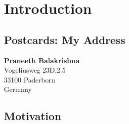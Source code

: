%
\chapter{Introduction}
\label{sec:intro}




\section{Postcards: My Address}
\label{sec:intro:address}

\textbf{Praneeth Balakrishna} \\
Vogeliusweg 23D.2.5 \\
33100 Paderborn \\
Germany


\section{Motivation}
\label{sec:intro:motivation}

